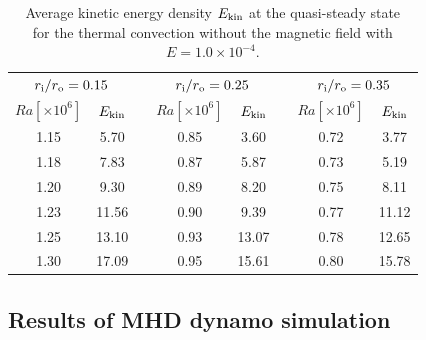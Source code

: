 %
\begin{table}
\caption{Average kinetic energy density $E_{\rm kin}$ at the quasi-steady state \\
for the thermal convection without the magnetic field with $E = 1.0 \times 10^{-4}$.}
\begin{center}
\begin{tabular}{|ccc|ccc|cc|}
   \hline
  \multicolumn{2}{|c|}{$r_{\rm i}/r_{\rm o} = 0.15$} & \hspace{5mm} &
  \multicolumn{2}{|c|}{$r_{\rm i}/r_{\rm o} = 0.25$} & \hspace{5mm} &
  \multicolumn{2}{|c|}{$r_{\rm i}/r_{\rm o} = 0.35$} \\
  $Ra[\times 10^6] $ &  $E_{\rm kin}$ & &
  $Ra[\times 10^6] $ &  $E_{\rm kin}$ & &
  $Ra[\times 10^6] $ &  $E_{\rm kin}$ \\
    \hline
  1.15 & 5.70 & & 0.85 & 3.60  & & 0.72 & 3.77 \\
  1.18 &  7.83 & & 0.87 & 5.87 & & 0.73 &  5.19 \\
  1.20 &  9.30 & & 0.89 & 8.20 & & 0.75 &  8.11 \\
  1.23 & 11.56 & & 0.90 & 9.39 & & 0.77 & 11.12 \\
  1.25 & 13.10 & & 0.93 & 13.07 & & 0.78 & 12.65  \\
  1.30 & 17.09 & & 0.95  & 15.61 & & 0.80 & 15.78 \\
 \hline
\end{tabular}
\end{center}
\label{table:Rac_Ek4}
\end{table}


\subsection{Results of MHD dynamo simulation}

